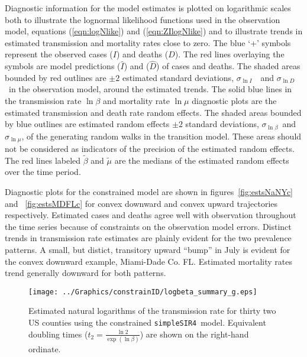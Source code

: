 \documentclass[12pt,letterpaper]{article}
\newcommand\SSm{{\tt simpleSIR4}}
\newcommand\slI{$\sigma_{\ln I}$\ }
\newcommand\slD{$\sigma_{\ln D}$}
\newcommand\slB{$\sigma_{\ln \beta}$}
\newcommand\slM{$\sigma_{\ln \mu}$}
\begin{document}
\label{pp:diagexpl} 
Diagnostic information for the model estimates is plotted
on logarithmic scales both to illustrate the
lognormal likelihood functions used in the observation model,
equations (\ref{eqn:logNlike}) and (\ref{eqn:ZIlogNlike}) and to
illustrate trends in estimated transmission and mortality rates close
to zero.
The blue `+' symbols represent the observed cases ($I$) and deaths ($D$).
The red lines overlaying the symbols are model predictions ($\widehat{I}$)
and ($\widehat{D}$) of cases and deaths. 
The shaded areas bounded by red outlines are 
$\pm 2$ estimated standard deviations, \slI\ and \slD\ in the
observation model, around the estimated trends.
The solid blue lines in the transmission rate $\ln \beta$ and
mortality rate $\ln \mu$ diagnostic plots are the estimated
transmission and death rate random effects.
The shaded areas bounded by blue outlines are
estimated random effects $\pm 2$ standard deviations, \slB\ and \slM,
of the generating random walks in the transition model.
These areas should not be considered as indicators of the precision
of the estimated random effects.
The red lines labeled $\tilde{\beta}$ and $\tilde{\mu}$ are the
medians of the estimated random effects over the time period.

Diagnostic plots for the constrained model are shown in
figures~\ref{fig:estsNaNYc} and~ \ref{fig:estsMDFLc}
for convex downward and convex upward trajectories
respectively.
Estimated cases and deaths agree well with observation throughout the
time series because of constraints on the observation model errors.
Distinct trends in transmission rate estimates are plainly evident for
the two prevalence patterns. A small, but distict, 
transitory upward ``bump'' in July is
evident for the convex downward example, Miami-Dade Co. FL.
Estimated mortality rates trend generally downward  for both patterns.

\begin{figure}[h!]
\begin{center}
\texttt{[image: ../Graphics/constrainID/logbeta\_summary\_g.eps]}\\
\end{center}
\caption{\label{fig:xrates}
Estimated natural logarithms of the transmission rate for thirty two US
counties using the constrained \SSm\ model.
Equivalent doubling times ($t_2 = \frac{\ln 2}{\exp(\ln \beta)}$)
are shown on the right-hand ordinate.
}
\end{figure}
\end{document}
